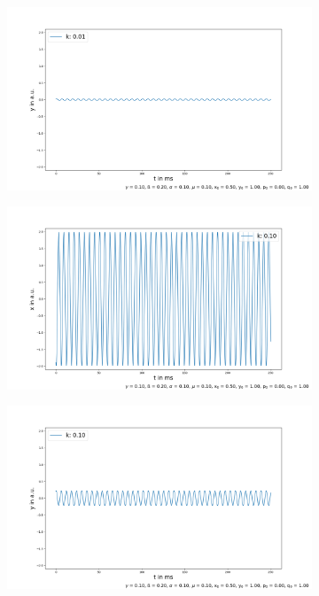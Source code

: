 \documentclass[oneside,10pt,a4paper]{report}
\begin{document}
\begin{figure}[H]
\begin{subfigure}[b]{0.45\textwidth}
				\caption{}
				\label{fig:x5}
			\end{subfigure}
			\hfill
			\begin{subfigure}[b]{0.45\textwidth}
				\includegraphics[width=\textwidth]{y_k5.png}
				\caption{}
				\label{fig: y5}
			\end{subfigure}
			\begin{subfigure}[b]{0.45\textwidth}
				\includegraphics[width=\textwidth]{x_k2.png}
				\caption{}
				\label{fig:x2}
			\end{subfigure}
			\hfill
			\begin{subfigure}[b]{0.45\textwidth}
				\includegraphics[width=\textwidth]{y_k2.png}

\end{subfigure}
\end{figure}
\end{document}
